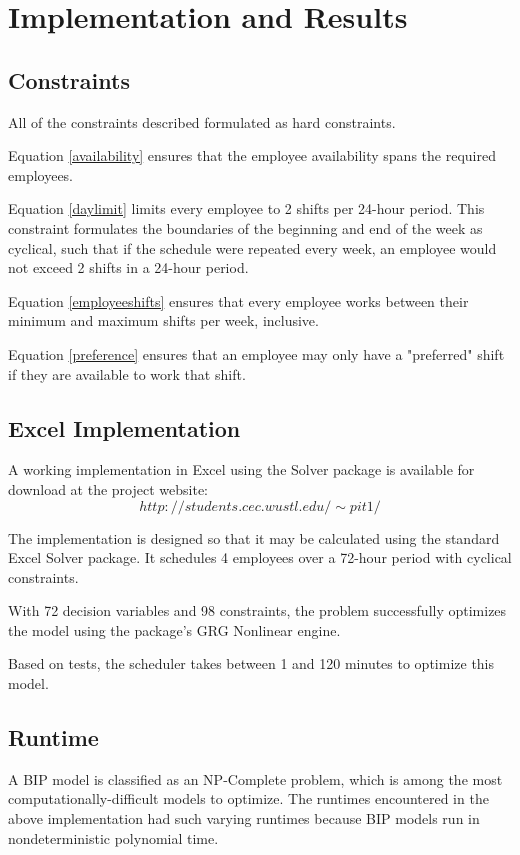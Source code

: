 \chapter{Implementation and Results}


\section{Constraints}
All of the constraints described formulated as hard constraints. 

Equation \eqref{availability} ensures that the employee availability spans the required employees.

Equation \eqref{daylimit} limits every employee to 2 shifts per 24-hour period. This constraint formulates the boundaries of the beginning and end of the week as cyclical, such that if the schedule were repeated every week, an employee would not exceed 2 shifts in a 24-hour period. 

Equation \eqref{employeeshifts} ensures that every employee works between their minimum and maximum shifts per week, inclusive.

Equation \eqref{preference} ensures that an employee may only have a "preferred" shift if they are available to work that shift. 

\section{Excel Implementation}
A working implementation in Excel using the Solver package is available for download at the project website:
$$http://students.cec.wustl.edu/\sim pit1/$$

The implementation is designed so that it may be calculated using the standard Excel Solver package. It schedules 4 employees over a 72-hour period with cyclical constraints. 

With 72 decision variables and 98 constraints, the problem successfully optimizes the model using the package's GRG Nonlinear engine. 

Based on tests, the scheduler takes between 1 and 120 minutes to optimize this model. 

\section{Runtime}

A BIP model is classified as an NP-Complete problem, which is among the most computationally-difficult models to optimize. The runtimes encountered in the above implementation had such varying runtimes because BIP models run in nondeterministic polynomial time. 

